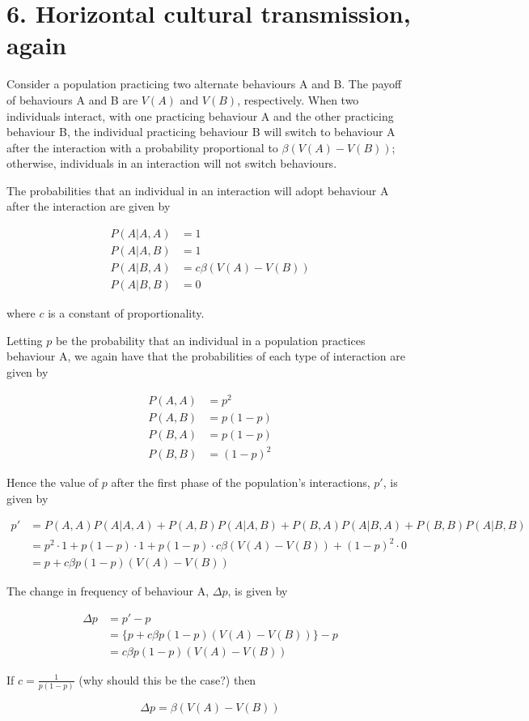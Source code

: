\documentclass{article}
\begin{document}
\section*{6. Horizontal cultural transmission, again}

Consider a population practicing two alternate behaviours A and B. The
payoff of behaviours A and B are $V(A)$ and $V(B)$, respectively. When
two individuals interact, with one practicing behaviour A and the other
practicing behaviour B, the individual practicing behaviour B will
switch to behaviour A after the interaction with a probability
proportional to $\beta (V(A) - V(B))$; otherwise, individuals in an
interaction will not switch behaviours.

The probabilities that an individual in an interaction will adopt
behaviour A after the interaction are given by

\begin{align*}
    P(A|A,A) &= 1 \\
    P(A|A,B) &= 1 \\
    P(A|B,A) &= c \beta (V(A) - V(B)) \\
    P(A|B,B) &= 0
\end{align*}

where $c$ is a constant of proportionality.

Letting $p$ be the probability that an individual in a population
practices behaviour A, we again have that the probabilities of each type
of interaction are given by

\begin{align*}
    P(A,A) &= p^2 \\
    P(A,B) &= p(1 - p) \\
    P(B,A) &= p(1 - p) \\
    P(B,B) &= (1 - p)^2
\end{align*}

Hence the value of $p$ after the first phase of the population's
interactions, $p'$, is given by

\begin{align*}
    p' &= P(A,A)P(A|A,A) + P(A,B)P(A|A,B) + P(B,A)P(A|B,A) + P(B,B)P(A|B,B) \\
       &= p^2 \cdot 1
          + p(1 - p) \cdot 1
          + p(1 - p) \cdot c \beta (V(A) - V(B))
          + (1 - p)^2 \cdot 0 \\
       &= p + c \beta p(1 - p)(V(A) - V(B))
\end{align*}

The change in frequency of behaviour A, $\Delta p$, is given by

\begin{align*}
    \Delta p &= p' - p \\
             &= \{p + c \beta p(1 - p)(V(A) - V(B))\} - p \\
             &= c \beta p(1 - p)(V(A) - V(B))
\end{align*}

If $c = \frac{1}{p(1 - p)}$ (why should this be the case?) then

\begin{equation*}
    \Delta p = \beta (V(A) - V(B))
\end{equation*}
\end{document}
